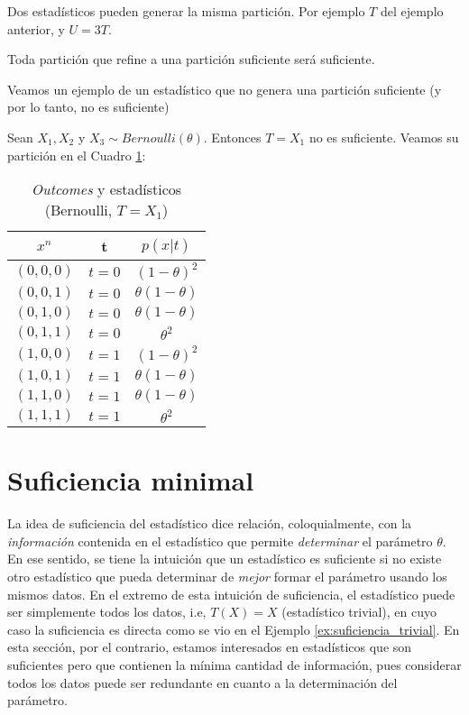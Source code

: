 \begin{remark}
Dos estadísticos pueden generar la misma partición. Por ejemplo $T$ del ejemplo anterior, y $U= 3 T$. 
\end{remark}
\begin{remark}
Toda partición que refine a una partición suficiente será suficiente.
\end{remark}
Veamos un ejemplo de un estadístico que no genera una partición suficiente (y por lo tanto, no es suficiente)
\begin{example}
Sean $X_1,X_2$ y $X_3 \sim Bernoulli(\theta)$. Entonces $T=X_1$ no es suficiente. Veamos su partición en el Cuadro \ref{tab: Part.Bernoulli no-suficiente}: 
\begin{table}[h]
    \centering
    \begin{tabular}{c  c  c}  
        $x^{n} $  & t  & $ p(x|t) $\\ \hline
        $ (0,0,0) $ & $t=0$ & $(1-\theta)^2$ \\  
       $ (0,0,1) $ & $t= 0$ & $\theta(1-\theta)$   \\
        $ (0,1,0) $ & $t=0$ & $\theta(1-\theta)$ \\
        $ (0,1,1) $ & $t=0$ & $\theta^2$   \\ \hline 
        $ (1,0,0) $  & $t=1$ & $(1-\theta)^2$ \\  
        $ (1,0,1) $ & $t=1$ & $\theta(1-\theta)$ \\
        $ (1,1,0) $  & $t=1$ & $\theta(1-\theta)$ \\ 
        $ (1,1,1) $ & $t= 1$ & $\theta^2$ \\
    \end{tabular}
    \caption{\emph{Outcomes} y estadísticos (Bernoulli, $T= X_1$)  }
        \label{tab: Part.Bernoulli no-suficiente}
\end{table}

\end{example}


\section{Suficiencia minimal}
La idea de suficiencia del estadístico dice relación, coloquialmente, con la \textit{información} contenida en el estadístico que permite \textit{determinar} el parámetro $\theta$. En ese sentido, se tiene la intuición que un estadístico es suficiente si no existe otro estadístico que pueda determinar de \textit{mejor} formar el parámetro usando los mismos datos. En el extremo de esta intuición de suficiencia, el estadístico puede ser simplemente todos los datos, i.e, $T(X)=X$ (estadístico trivial), en cuyo caso la suficiencia es directa como se vio en el Ejemplo \ref{ex:suficiencia_trivial}. En esta sección, por el contrario, estamos interesados en estadísticos que son suficientes pero que contienen la mínima cantidad de información, pues considerar todos los datos puede ser redundante en cuanto a la determinación del parámetro.\\ 

